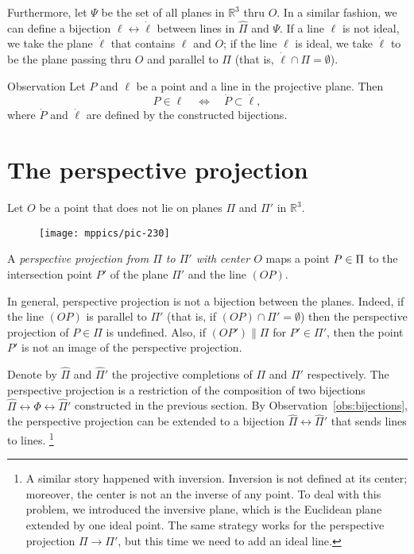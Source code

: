 Furthermore, let $\Psi$ be the set of all planes in $\mathbb{R}^3$ thru $O$.
In a similar fashion, we can define a bijection $\ell\leftrightarrow \dot \ell$ between lines in $\hat \Pi$ and $\Psi$.
If a line $\ell$ is not ideal, we take the plane $\dot \ell$ that contains $\ell$ and $O$;
if the line $\ell$ is ideal, we take $\dot \ell$ to be the plane passing thru $O$ and parallel to $\Pi$ (that is, $\dot\ell\cap\Pi=\emptyset$).

\begin{thm}{Observation}\label{obs:bijections}
Let $P$ and $\ell$ be a point and a line in the projective plane.
Then 
\[P\in \ell \quad\iff\quad \dot P\subset \dot \ell,\]
where $\dot P$ and $\dot \ell$ are defined by the constructed bijections.
\end{thm}

\section{The perspective projection}
\label{sec:perspective-projection}

Let $O$ be a point that does not lie on planes $\Pi$ and $\Pi'$ in $\mathbb{R}^3$.

\begin{wrapfigure}{o}{43mm}
\centering
\vskip-4mm
\texttt{[image: mppics/pic-230]}
\end{wrapfigure}

A \emph{perspective projection from $\Pi$ to $\Pi'$ with center $O$} maps a point $P\in \Pi$
to the intersection point $P'$ of the plane $\Pi'$ and the line $(OP)$.

In general, perspective projection is not a bijection between the planes.
Indeed, if the line $(OP)$ is parallel to $\Pi'$ 
(that is, if $(OP)\cap\Pi'=\emptyset$)
then the perspective projection of $P\in \Pi$ is undefined.
Also, if $(OP')\parallel \Pi$ 
for $P'\in \Pi'$,
then the point $P'$ is not an image of the perspective projection.

Denote by $\hat \Pi$ and $\hat \Pi'$ the projective completions of $\Pi$ and $\Pi'$ respectively. 
The perspective projection is a restriction of the composition of two bijections $\hat \Pi\leftrightarrow\Phi \leftrightarrow\hat \Pi'$ constructed in the previous section.
By Observation~\ref{obs:bijections}, the perspective projection can be extended to a bijection $\hat \Pi\leftrightarrow\hat \Pi'$ that sends lines to lines.%
\footnote{A similar story happened with inversion.
Inversion is not defined at its center;
moreover, the center is not an the inverse of any point.
To deal with this problem, we introduced the inversive plane, 
which is the Euclidean plane extended by one ideal point.
The same strategy works for the perspective projection $\Pi\to\Pi'$, but this time we need to add an ideal line.}

